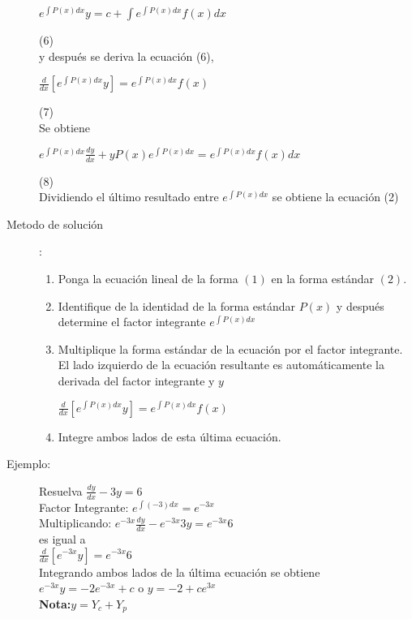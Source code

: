 \documentclass{article}
\begin{document}
\begin{description}
\begin{center}
    $e^{\int P(x)dx}y = c + \int e^{\int P(x)dx}f(x)dx$
\end{center}\tab(6)\\
y después se deriva la ecuación (6),
\begin{center}
    $\frac{d}{dx}[e^{\int P(x)dx}y] = e^{\int P(x)dx}f(x)$
\end{center}\tab(7)\\
Se obtiene 
\begin{center}
    $ e^{\int P(x)dx}\frac{dy}{dx} + y P(x)  e^{\int P(x)dx} = e^{\int P(x)dx}f(x)dx$
\end{center}\tab(8)\\
Dividiendo el último resultado entre $e^{\int P(x)dx}$ se obtiene la ecuación (2)
\item[Metodo de solución]:\\
\begin{center}
    \begin{enumerate}
        \item Ponga la ecuación lineal de la forma $(1)$ en la forma estándar $(2)$.
        \item Identifique de la identidad de la forma estándar $P(x)$ y después determine el factor integrante $e^{\int P(x)dx}$
        \item Multiplique la forma estándar de la ecuación por el factor integrante. El lado izquierdo de la ecuación resultante es automáticamente la derivada del factor integrante y $y$
        \begin{center}
            $\frac{d}{dx}[e^{\int P(x)dx}y] = e^{\int P(x)dx}f(x)$
        \end{center}
        \item Integre ambos lados de esta última ecuación.
    \end{enumerate}
\end{center}
\item[Ejemplo:] Resuelva $\frac{dy}{dx}-3y = 6$\\
Factor Integrante: $e^{\int (-3)dx} =e^{-3x} $\\
Multiplicando: $e^{-3x}\frac{dy}{dx} - e^{-3x}3y = e^{-3x}6$\\es igual a\\
$\frac{d}{dx}[e^{-3x}y] = e^{-3x}6$\\
Integrando ambos lados de la última ecuación se obtiene $e^{-3x}y = -2e^{-3x} + c$ o \underline{$y = -2 +ce^{3x}$}\\
\textbf{Nota:}$y=Y_c +Y_p$
\end{description}
\printbibliography
\end{document}
